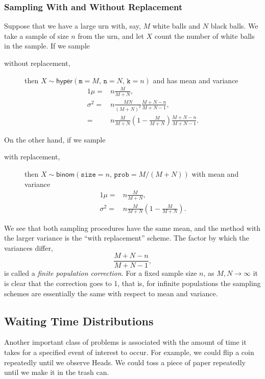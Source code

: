 \documentclass[captions=tableheading]{scrbook}
\begin{document}
\subsubsection{Sampling With and Without Replacement}
\label{sec-5-6-1-2}
\label{sub-Sampling-With-and}


Suppose that we have a large urn with, say, \(M\) white balls and \(N\) black balls. We take a sample of size \(n\) from the urn, and let \(X\) count the number of white balls in the sample. If we sample
\begin{description}
\item[without replacement,] then \(X\sim\mathsf{hyper}(\mathtt{m=}M,\,\mathtt{n}=N,\,\mathtt{k}=n)\) and has mean and variance
     \begin{alignat*}{1}
     \mu= & n\frac{M}{M+N},\\
     \sigma^{2}= & n\frac{MN}{(M+N)^{2}}\frac{M+N-n}{M+N-1},\\
     = & n\frac{M}{M+N}\left(1-\frac{M}{M+N}\right)\frac{M+N-n}{M+N-1}.
     \end{alignat*}
\end{description}
On the other hand, if we sample
\begin{description}
\item[with replacement,] then \(X\sim\mathsf{binom}(\mathtt{size}=n,\,\mathtt{prob}=M/(M+N))\) with mean and variance
     \begin{alignat*}{1}
     \mu= & n\frac{M}{M+N},\\
     \sigma^{2}= & n\frac{M}{M+N}\left(1-\frac{M}{M+N}\right).
     \end{alignat*}
\end{description}
We see that both sampling procedures have the same mean, and the method with the larger variance is the ``with replacement'' scheme. The factor by which the variances differ,
\begin{equation}
\frac{M+N-n}{M+N-1},
\end{equation}
is called a \emph{finite population correction}. For a fixed sample size \(n\), as \(M,N\to\infty\) it is clear that the correction goes to 1, that is, for infinite populations the sampling schemes are essentially the same with respect to mean and variance.
\subsection{Waiting Time Distributions}
\label{sec-5-6-2}
\label{sec-Waiting-Time-Distributions}


Another important class of problems is associated with the amount of time it takes for a specified event of interest to occur. For example, we could flip a coin repeatedly until we observe Heads. We could toss a piece of paper repeatedly until we make it in the trash can.
\end{document}
